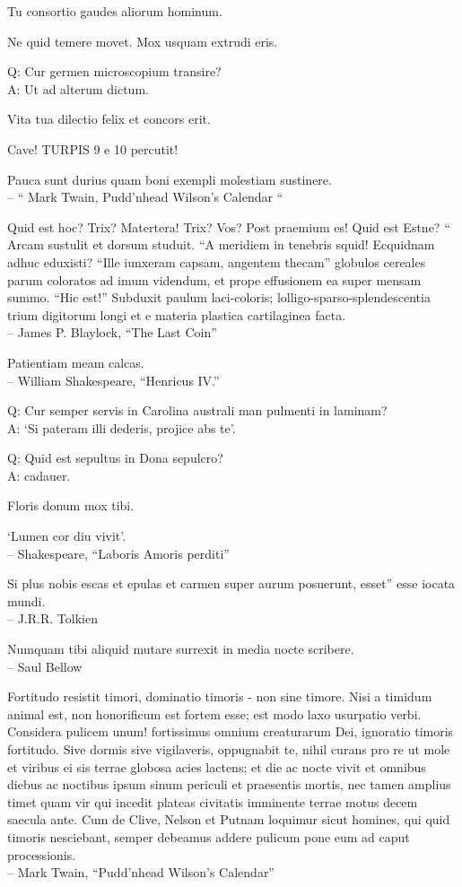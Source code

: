 \documentclass[titlepage,12pt]{memoir}
\begin{document}
Tu consortio gaudes aliorum hominum.

Ne quid temere movet. Mox usquam extrudi eris.

Q: Cur germen microscopium transire?\\
A: Ut ad alterum dictum.

Vita tua dilectio felix et concors erit.

Cave! TURPIS 9 e 10 percutit!

 Pauca sunt durius quam boni exempli molestiam sustinere.
\\-- “ Mark Twain, Pudd’nhead Wilson’s Calendar “

Quid est hoc? Trix? Matertera! Trix? Vos? Post praemium es! Quid est
Estne? “ Arcam sustulit et dorsum studuit. “A meridiem in tenebris
squid! Ecquidnam adhuc eduxisti? “Ille iunxeram capsam, angentem thecam”
globulos cereales parum coloratos ad imum videndum, et prope effusionem
ea super mensam summo. “Hic est!” Subduxit paulum laci-coloris;
lolligo-sparso-splendescentia trium digitorum longi et e materia plastica cartilaginea facta.
\\-- James P. Blaylock, “The Last Coin”

Patientiam meam calcas.
\\-- William Shakespeare, “Henricus IV.”

Q: Cur semper servis in Carolina australi man
pulmenti in laminam?\\
A: ‘Si pateram illi dederis, projice abs te’.

Q: Quid est sepultus in Dona sepulcro?\\
A: cadauer.

Floris donum mox tibi.

‘Lumen cor diu vivit’.
\\-- Shakespeare, “Laboris Amoris perditi”

Si plus nobis escas et epulas et carmen super aurum posuerunt, esset”
esse iocata mundi.
\\-- J.R.R. Tolkien

Numquam tibi aliquid mutare surrexit in media nocte
scribere.
\\-- Saul Bellow

Fortitudo resistit timori, dominatio timoris - non sine timore. Nisi a
timidum animal est, non honorificum est fortem esse; est modo
laxo usurpatio verbi. Considera pulicem unum!
fortissimus omnium creaturarum Dei, ignoratio timoris fortitudo.
Sive dormis sive vigilaveris, oppugnabit te, nihil curans pro re
ut mole et viribus ei sis terrae globosa acies
lactens; et die ac nocte vivit et omnibus diebus ac noctibus
ipsum sinum periculi et praesentis mortis, nec tamen amplius
timet quam vir qui incedit plateas civitatis imminente
terrae motus decem saecula ante. Cum de Clive, Nelson et Putnam loquimur
sicut homines, qui quid timoris nesciebant, semper debeamus addere pulicum
pone eum ad caput processionis.
\\-- Mark Twain, “Pudd’nhead Wilson’s Calendar”
\end{document}
